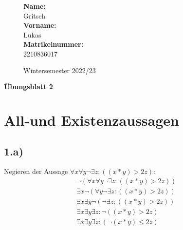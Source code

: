 \documentclass[10pt,ngerman]{scrartcl}
\begin{document}
\begin{figure}[htbp]
\begin{minipage}[b]{0.50\linewidth}
\begin{Large}

	\textbf{Name:}\\
	Gritsch 			\\
	\textbf{Vorname:}\\
	Lukas 				\\
	\textbf{Matrikelnummer:}\\
	2210836017

\end{Large}
\end{minipage}
\begin{minipage}[b]{0.50\linewidth}
\begin{flushright}
\begin{Huge}
\end{Huge}
\vspace{10px}
\begin{large}
Wintersemester 2022/23
\end{large}
\end{flushright}
\end{minipage}
\end{figure}

\vspace{20px}
\begin{huge}
\noindent

\textbf{Übungsblatt 2}
\end{huge}

\pagebreak
\section{All-und Existenzaussagen}
\subsection{1.a)}
Negieren der Aussage $\forall x \forall y \neg \exists z : ((x*y) > 2z)$:
\setcounter{equation}{0}
\begin{align}
\neg(\forall x \forall y \neg \exists z : ((x*y) > 2z))\\
\exists x \neg(\forall y \neg \exists z : ((x*y) > 2z))\\
\exists x \exists y \neg (\neg \exists z : ((x*y) > 2z))\\
\exists x \exists y \exists z : \neg ((x*y) > 2z)\\
\exists x \exists y \exists z : (\neg (x*y) \leq 2z)
\end{align}
\end{document}
